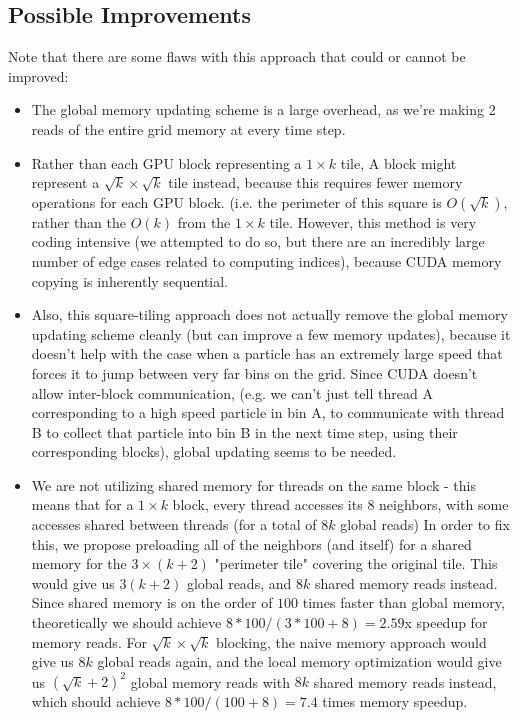 \documentclass[12pt]{article}
\begin{document}
\subsection{Possible Improvements}
Note that there are some flaws with this approach that could or cannot be improved:
\begin{itemize}
\item The global memory updating scheme is a large overhead, as we're making 2 reads of the entire grid memory at every time step.

\item Rather than each GPU block representing a $1 \times k$ tile, A block might represent a $\sqrt{k} \times \sqrt{k}$ tile instead, because this requires fewer memory operations for each GPU block. (i.e. the perimeter of this square is $O(\sqrt{k})$, rather than the $O(k)$ from the $1 \times k$ tile. However, this method is very coding intensive (we attempted to do so, but there are an incredibly large number of edge cases related to computing indices), because CUDA memory copying is inherently sequential. 

\item Also, this square-tiling approach does not actually remove the global memory updating scheme cleanly (but can improve a few memory updates), because it doesn't help with the case when a particle has an extremely large speed that forces it to jump between very far bins on the grid. Since CUDA doesn't allow inter-block communication, (e.g. we can't just tell thread A corresponding to a high speed particle in bin A, to communicate with thread B to collect that particle into bin B in the next time step, using their corresponding blocks), global updating seems to be needed. 

\item We are not utilizing shared memory for threads on the same block - this means that for a $1 \times k$ block, every thread accesses its 8 neighbors, with some accesses shared between threads (for a total of $8k$ global reads) In order to fix this, we propose preloading all of the neighbors (and itself) for a shared memory for the $3 \times (k+2)$ "perimeter tile" covering the original tile. This would give us $3(k+2)$ global reads, and $8k$ shared memory reads instead. Since shared memory is on the order of $100$ times faster than global memory, theoretically we should achieve $8*100/(3*100 + 8) = 2.59$x speedup for memory reads. For $\sqrt{k} \times \sqrt{k}$ blocking, the naive memory approach would give us $8k$ global reads again, and the local memory optimization would give us $(\sqrt{k}+2)^{2}$ global memory reads with $8k$ shared memory reads instead, which should achieve $8*100/(100 + 8) = 7.4$ times memory speedup.  
\end{itemize}
\end{document}
